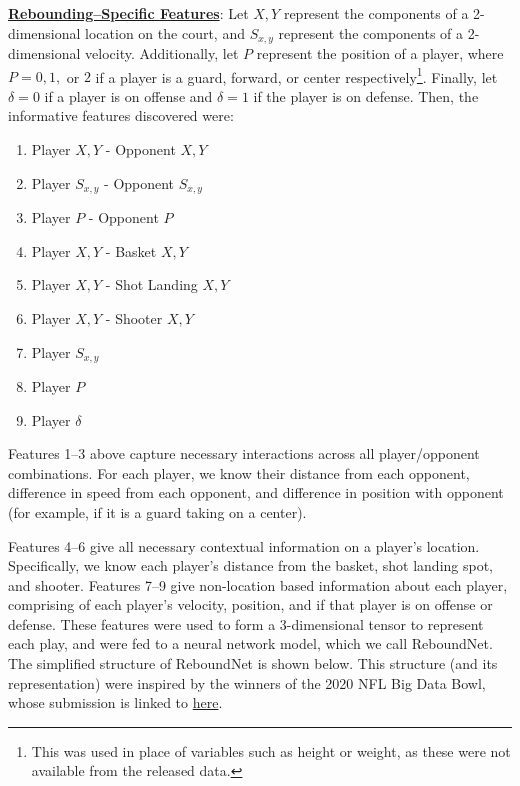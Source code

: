 \documentclass{article}
\begin{document}
\bigbreak
\noindent
\underline{{\bf Rebounding--Specific Features}}:
Let $X,Y$ represent the components of a 2-dimensional location on the court, and $S_{x,y}$ represent the components of a 2-dimensional velocity. Additionally, let $P$ represent the position of a player, where $P = 0, 1, $ or $2$ if a player is a guard, forward, or center respectively\footnote{This was used in place of variables such as height or weight, as these were not available from the released data.}. Finally, let $\delta = 0$ if a player is on offense and $\delta = 1$ if the player is on defense. Then, the informative features discovered were:

\bigbreak
\begin{enumerate}
\itemsep0em 
	\item{Player $X,Y$ - Opponent $X,Y$}
	\item{Player $S_{x,y}$ - Opponent $S_{x,y}$}
	\item{Player $P$ - Opponent $P$}
	\item{Player $X,Y$ - Basket $X,Y$}
	\item{Player $X,Y$ - Shot Landing $X,Y$}
	\item{Player $X,Y$ - Shooter $X,Y$}
	\item{Player $S_{x,y}$}
	\item{Player $P$}
	\item{Player $\delta$}
\end{enumerate}	

\bigbreak
\noindent
Features 1--3 above capture necessary interactions across all player/opponent combinations. For each player, we know their distance from each opponent, difference in speed from each opponent, and difference in position with opponent (for example, if it is a guard taking on a center). 

\bigbreak
\noindent
Features 4--6 give all necessary contextual information on a player's location. Specifically, we know each player's distance from the basket, shot landing spot, and shooter. Features 7--9 give non-location based information about each player, comprising of each player's velocity, position, and if that player is on offense or defense.
\bigbreak
\noindent
These features were used to form a 3-dimensional tensor to represent each play, and were fed to a neural network model, which we call ReboundNet. The simplified structure of ReboundNet is shown below. This structure (and its representation) were inspired by the winners of the 2020 NFL Big Data Bowl, whose submission is linked to \href{https://www.kaggle.com/c/nfl-big-data-bowl-2020/discussion/119400}{here}.
\end{document}

